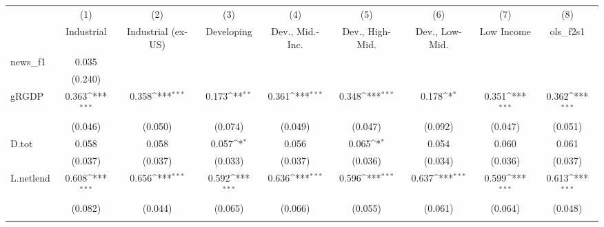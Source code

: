 {
\def\sym#1{\ifmmode^{#1}\else\(^{#1}\)\fi}
\begin{tabular}{l*{8}{c}}
\toprule
            &\multicolumn{1}{c}{(1)}&\multicolumn{1}{c}{(2)}&\multicolumn{1}{c}{(3)}&\multicolumn{1}{c}{(4)}&\multicolumn{1}{c}{(5)}&\multicolumn{1}{c}{(6)}&\multicolumn{1}{c}{(7)}&\multicolumn{1}{c}{(8)}\\
            &\multicolumn{1}{c}{Industrial}&\multicolumn{1}{c}{Industrial (ex-US)}&\multicolumn{1}{c}{Developing}&\multicolumn{1}{c}{Dev., Mid.-Inc.}&\multicolumn{1}{c}{Dev., High-Mid.}&\multicolumn{1}{c}{Dev., Low-Mid.}&\multicolumn{1}{c}{Low Income}&\multicolumn{1}{c}{ols\_f2s1}\\
\midrule
news\_f1     &       0.035         &                     &                     &                     &                     &                     &                     &                     \\
            &     (0.240)         &                     &                     &                     &                     &                     &                     &                     \\
\addlinespace
gRGDP       &       0.363\sym{***}&       0.358\sym{***}&       0.173\sym{**} &       0.361\sym{***}&       0.348\sym{***}&       0.178\sym{*}  &       0.351\sym{***}&       0.362\sym{***}\\
            &     (0.046)         &     (0.050)         &     (0.074)         &     (0.049)         &     (0.047)         &     (0.092)         &     (0.047)         &     (0.051)         \\
\addlinespace
D.tot       &       0.058         &       0.058         &       0.057\sym{*}  &       0.056         &       0.065\sym{*}  &       0.054         &       0.060         &       0.061         \\
            &     (0.037)         &     (0.037)         &     (0.033)         &     (0.037)         &     (0.036)         &     (0.034)         &     (0.036)         &     (0.037)         \\
\addlinespace
L.netlend   &       0.608\sym{***}&       0.656\sym{***}&       0.592\sym{***}&       0.636\sym{***}&       0.596\sym{***}&       0.637\sym{***}&       0.599\sym{***}&       0.613\sym{***}\\
            &     (0.082)         &     (0.044)         &     (0.065)         &     (0.066)         &     (0.055)         &     (0.061)         &     (0.064)         &     (0.048)         \\
\addlinespace

\end{tabular}}
